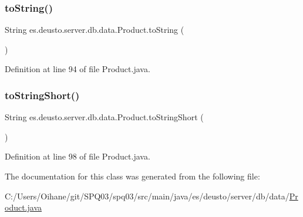 \subsubsection{\texorpdfstring{to\+String()}{toString()}}
{\footnotesize\ttfamily String es.\+deusto.\+server.\+db.\+data.\+Product.\+to\+String (\begin{DoxyParamCaption}{ }\end{DoxyParamCaption})}



Definition at line 94 of file Product.\+java.

\mbox{\label{classes_1_1deusto_1_1server_1_1db_1_1data_1_1_product_ada09de3915be881fe42f6f61bfd048f8}} 
\subsubsection{\texorpdfstring{to\+String\+Short()}{toStringShort()}}
{\footnotesize\ttfamily String es.\+deusto.\+server.\+db.\+data.\+Product.\+to\+String\+Short (\begin{DoxyParamCaption}{ }\end{DoxyParamCaption})}



Definition at line 98 of file Product.\+java.



The documentation for this class was generated from the following file\+:\begin{DoxyCompactItemize}
\item 
C\+:/\+Users/\+Oihane/git/\+S\+P\+Q03/spq03/src/main/java/es/deusto/server/db/data/\hyperlink{_product_8java}{Product.\+java}\end{DoxyCompactItemize}
